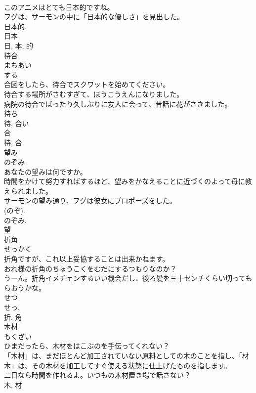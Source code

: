 \documentclass[8pt]{extreport}
\begin{document}
\begin{CJK}{UTF8}{min}
\\	このアニメはとても日本的ですね。	
\\	フグは、サーモンの中に「日本的な優しさ」を見出した。	
\\	日本的.	
\\	日本 
\\	日, 本, 的	
\\	待合	
\\	まちあい	
\\	する 
\\	合図をしたら、待合でスクワットを始めてください。	
\\	待合する場所がさむすぎて、ぼうこうえんになりました。	
\\	病院の待合でばったり久しぶりに友人に会って、昔話に花がさきました。	
\\	待ち 
\\	待, 合い 
\\	合 
\\	待, 合	
\\	望み	
\\	のぞみ	
\\	あなたの望みは何ですか。	
\\	時間をかけて努力すればするほど、望みをかなえることに近づくのよって母に教えられました。	
\\	サーモンの望み通り、フグは彼女にプロポーズをした。	
\\	(のぞ). 
\\	のぞみ.
\\	望	
\\	折角	
\\	せっかく	
\\	折角ですが、これ以上妥協することは出来かねます。	
\\	おれ様の折角のちゅうこくをむだにするつもりなのか？	
\\	うーん。折角イメチェンするいい機会だし、後ろ髪を三十センチくらい切ってもらおうかな。	
\\	せつ 
\\	せっ, 
\\	折, 角	
\\	木材	
\\	もくざい	
\\	ひまだったら、木材をはこぶのを手伝ってくれない？	
\\	「木材」は、まだほとんど加工されていない原料としての木のことを指し、「材木」は、その木材を加工してすぐ使える状態に仕上げたものを指します。	
\\	二日なら時間を作れるよ。いつもの木材置き場で話さない？	
\\	木, 材	

\end{CJK}
\end{document}
